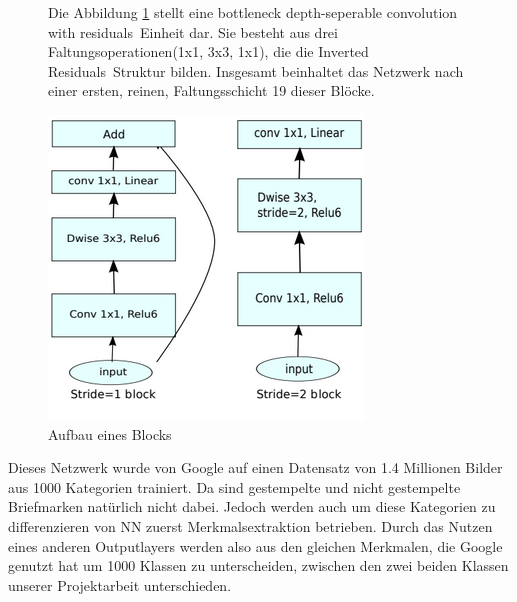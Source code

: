 \documentclass[12pt,toc=bib,toc=listof]{scrreprt}
\begin{document}
\begin{figure}[h]
\begin{minipage}[t]{.51\linewidth}

Die Abbildung \ref{fig:nn_arc} stellt eine \dq bottleneck depth-seperable convolution with residuals\dq\  Einheit dar. Sie besteht aus drei Faltungsoperationen(1x1, 3x3, 1x1), die die \dq Inverted Residuals\dq\ Struktur bilden. Insgesamt beinhaltet das Netzwerk nach einer ersten, reinen, Faltungsschicht 19 dieser Blöcke.
\end{minipage}
\hfill
\begin{minipage}[t]{.44\linewidth}
\strut\vspace*{-\baselineskip}
\newline
  \includegraphics[width=\linewidth]{./bilder/mobnet_arc}
  \caption{Aufbau eines Blocks \cite{sandler2019mobilenetv2}}
  \label{fig:nn_arc}
\end{minipage}
\end{figure}

Dieses Netzwerk wurde von Google auf einen Datensatz von 1.4 Millionen Bilder aus 1000 Kategorien trainiert. Da sind gestempelte und nicht gestempelte Briefmarken natürlich nicht dabei. Jedoch werden auch um diese Kategorien zu differenzieren von NN zuerst Merkmalsextraktion betrieben. Durch das Nutzen eines anderen Outputlayers werden also aus den gleichen Merkmalen, die Google genutzt hat um 1000 Klassen zu unterscheiden, zwischen den zwei beiden Klassen unserer Projektarbeit unterschieden.
 
\end{document}
